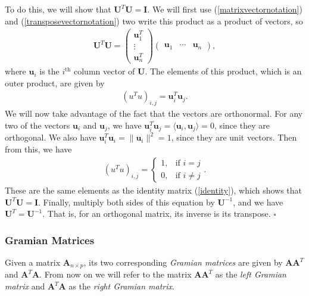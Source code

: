 \documentclass[10pt]{article}
\newcommand{\done}{\hfill $\square$}
\newcommand{\mydef}[1]{\textcolor{SteelBlue3}{\textit{#1}}} %
\begin{document}
To do this, we will show that $\mathbf{U}^T \mathbf{U} = \mathbf{I}$. We will first use (\ref{matrixvectornotation}) and (\ref{transposevectornotation}) two write this product as a product of vectors, so 
\begin{align*}
    \mathbf{U}^T \mathbf{U} = \begin{pmatrix}
        \mathbf{u}_1^T \\ \vdots \\ \mathbf{u}_n^T
    \end{pmatrix} 
    \begin{pmatrix}
        \mathbf{u}_1 & \cdots & \mathbf{u}_n
    \end{pmatrix},
\end{align*}
where $\mathbf{u}_i$ is the $i^{\text{th}}$ column vector of $\mathbf{U}$. The elements of this product, which is an outer product, are given by 
\begin{align*}
    (u^T u)_{i,j} = \mathbf{u}_i^T \mathbf{u}_j.
\end{align*}
We will now take advantage of the fact that the vectors are orthonormal. For any two of the vectors $\mathbf{u}_i$ and $\mathbf{u}_j$, we have $\mathbf{u}_i^T \mathbf{u}_j = \langle \mathbf{u}_i, \mathbf{u}_j \rangle = 0$, since they are orthogonal. We also have $\mathbf{u}_i^T \mathbf{u}_i = \| \mathbf{u}_i \|^2 = 1$, since they are unit vectors. Then from this, we have 
\begin{align*}
    (u^T u)_{i,j} = \begin{cases}
        1, & \text{if } i = j \\
        0, & \text{if } i \not = j
    \end{cases}.
\end{align*}
These are the same elements as the identity matrix (\ref{identity}), which shows that $\mathbf{U}^T \mathbf{U} = \mathbf{I}$. Finally, multiply both sides of this equation by $\mathbf{U}^{-1}$, and we have $\mathbf{U}^T = \mathbf{U}^{-1}$. That is, for an orthogonal matrix, its inverse is its transpose. \done

\subsubsection{Gramian Matrices}

Given a matrix $\mathbf{A}_{n \times p}$, its two corresponding \mydef{Gramian matrices} are given by $\mathbf{A} \mathbf{A}^T$ and $\mathbf{A}^T \mathbf{A}$. From now on we will refer to the matrix $\mathbf{A} \mathbf{A}^T$ as the \mydef{left Gramian matrix} and $\mathbf{A}^T \mathbf{A}$ as the \mydef{right Gramian matrix}.
\end{document}
